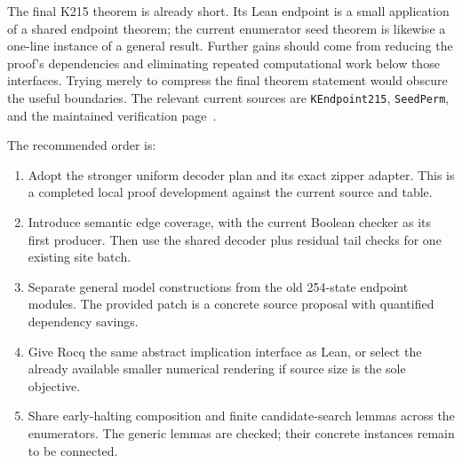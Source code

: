 \documentclass[11pt,letterpaper]{article}
\newcommand{\code}[1]{\texttt{\small #1}}
\begin{document}
The final K215 theorem is already short. Its Lean endpoint is a small application of a
shared endpoint theorem; the current enumerator seed theorem is likewise a one-line
instance of a general result. Further gains should come from reducing the proof's
dependencies and eliminating repeated computational work below those interfaces.
Trying merely to compress the final theorem statement would obscure the useful boundaries.
The relevant current sources are \code{KEndpoint215}, \code{SeedPerm}, and the maintained
verification page~\cite{endpoint,verification}.

The recommended order is:
\begin{enumerate}
\item Adopt the stronger uniform decoder plan and its exact zipper adapter. This is a
completed local proof development against the current source and table.
\item Introduce semantic edge coverage, with the current Boolean checker as its first
producer. Then use the shared decoder plus residual tail checks for one existing site batch.
\item Separate general model constructions from the old 254-state endpoint modules.
The provided patch is a concrete source proposal with quantified dependency savings.
\item Give Rocq the same abstract implication interface as Lean, or select the already
available smaller numerical rendering if source size is the sole objective.
\item Share early-halting composition and finite candidate-search lemmas across the
enumerators. The generic lemmas are checked; their concrete instances remain to be connected.
\end{enumerate}
\end{document}
